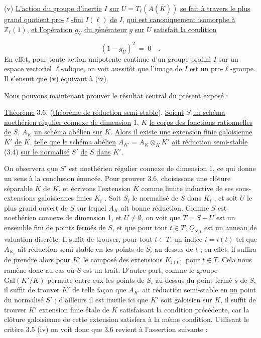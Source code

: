 (v) \underline{L'action du groupe d'inertie} $I$ \underline{sur} $U = T_\ell(A(\overline{K}))$ \underline{se fait à travers le plus grand quotient pro-$\ell$-fini} $I(\ell)$ \underline{de} $I$, \underline{qui est canoniquement isomorphe à} $\mathbb{Z}_\ell(1)$, \underline{et l'opération} $g_U$ \underline{du générateur} $g$ \underline{sur} $U$ \underline{satisfait la condition}

\begin{equation}\tag{3.5.3}
(1 - g_U)^2 \ = \ 0 \quad .
\end{equation}
En effet, pour toute action unipotente continue d'un groupe profini $I$ sur un espace vectoriel $\ell$-adique, on voit aussitôt que l'image de $I$ est un pro-$\ell$-groupe. Il s'ensuit que (v) équivaut à (iv).

Nous pouvons maintenant prouver le résultat central du présent exposé :

\underline{Théorème} 3.6. (\underline{théorème de réduction semi-stable}). \underline{Soient} $S$ \underline{un schéma noethérien régulier connexe de dimension} 1, $K$ \underline{le corps des fonctions rationnelles de} $S$, $A_K$ \underline{un schéma abélien sur} $K$. \underline{Alors il existe une extension finie galoisienne} $K'$ \underline{de} $K$, \underline{telle que le schéma abélien} $A_{K'} = A_K \otimes_K K'$ \underline{ait réduction semi-stable} (3.4) \underline{sur le normalisé} $S'$ \underline{de} $S$ \underline{dans} $K'$.



On observera que $S'$ est noethérien régulier connexe de dimension 1, ce qui donne un sens à la conclusion énoncée. Pour prouver 3.6, choisissons une clôture séparable $\overline{K}$ de $K$, et écrivons l'extension $\overline{K}$ comme limite inductive de ses sous-extensions galoisiennes finies $K_i$ . Soit $S_i$ le normalisé de $S$ dans $K_i$ , et soit $U$ le plus grand ouvert de $S$ sur lequel $A_K$ ait bonne réduction. Comme $S$ est noethérien connexe de dimension 1, et $U \neq \emptyset$, on voit que $T = S-U$ est un ensemble fini de points fermés de $S$, et que pour tout $t \in T$, $\underline{O}_{S,t}$ est un anneau de valuation discrète. Il suffit de trouver, pour tout $t \in T$, un indice $i = i(t)$ tel que $A_{K_i}$ ait réduction semi-stable en les points de $S_i$ au-dessus de $t$ ; en effet, il suffira de prendre alors pour $K'$ le composé des extensions $K_{i(t)}$ pour $t \in T$. Cela nous ramène donc au cas où $S$ est un trait. D'autre part, comme le groupe $\mathrm{Gal}(K'/K)$ permute entre eux les points de $S_i$ au-dessus du point fermé $s$ de $S$, il suffit de trouver $K'$ de telle façon que $A_{K'}$ ait réduction semi-stable en \underline{un} point du normalisé $S'$ ; d'ailleurs il est inutile ici que $K'$ soit galoisien sur $K$, il suffit de trouver $K'$ extension finie étale de $K$ satisfaisant la condition précédente, car la clôture galoisienne de cette extension satisfera à la même condition. Utilisant le critère 3.5 (iv) on voit donc que 3.6 revient à l'assertion suivante :

